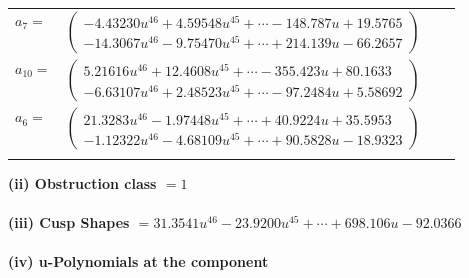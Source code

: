 \documentclass[1p]{elsarticle_modified}
\theoremstyle{definition}
\begin{document}
\begin{tabular}{m{7pt} m{180pt} m{7pt} m{180pt} }
\flushright $a_{7}=$&$\begin{pmatrix}-4.43230 u^{46}+4.59548 u^{45}+\cdots-148.787 u+19.5765\\-14.3067 u^{46}-9.75470 u^{45}+\cdots+214.139 u-66.2657\end{pmatrix}$ \\
\flushright $a_{10}=$&$\begin{pmatrix}5.21616 u^{46}+12.4608 u^{45}+\cdots-355.423 u+80.1633\\-6.63107 u^{46}+2.48523 u^{45}+\cdots-97.2484 u+5.58692\end{pmatrix}$ \\
\flushright $a_{6}=$&$\begin{pmatrix}21.3283 u^{46}-1.97448 u^{45}+\cdots+40.9224 u+35.5953\\-1.12322 u^{46}-4.68109 u^{45}+\cdots+90.5828 u-18.9323\end{pmatrix}$\\&\end{tabular}
\flushleft \textbf{(ii) Obstruction class $= 1$}\\~\\
\flushleft \textbf{(iii) Cusp Shapes $= 31.3541 u^{46}-23.9200 u^{45}+\cdots+698.106 u-92.0366$}\\~\\
\newpage\renewcommand{\arraystretch}{1}
\flushleft \textbf{(iv) u-Polynomials at the component}\newline \\
\end{document}
